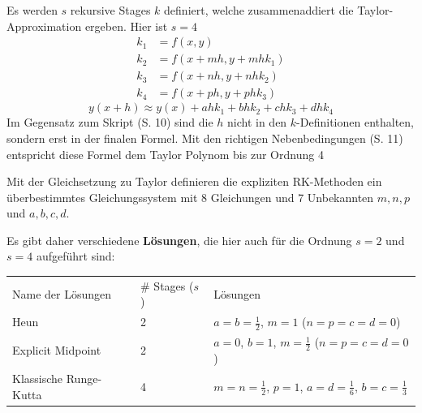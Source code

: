  \newpage     
      Es werden $s$ rekursive Stages $k$ definiert, welche zusammenaddiert die Taylor-Approximation ergeben.
      Hier ist $s=4$
      \begin{align*}
        k_1 &= f(x,y)\\
        k_2 &= f(x + m h, y+m h k_1)\\
        k_3 &= f(x + n h, y+n h  k_2)\\
        k_4 &= f(x + p h, y+p h k_3) 
      \end{align*}     
      $$y(x+h) \approx y(x) + a h k_1 + b h k_2 + c h k_3 + d h k_4 $$ 
      Im Gegensatz zum Skript (S. 10) sind die 
      $h$ nicht in den $k$-Definitionen enthalten, sondern erst in der finalen Formel. Mit den richtigen Nebenbedingungen (S. 11) 
      entspricht diese Formel dem Taylor Polynom bis zur Ordnung 4
      
      Mit der Gleichsetzung zu Taylor definieren die expliziten RK-Methoden ein 
      überbestimmtes Gleichungssystem mit 8 Gleichungen und 7 Unbekannten $m,n,p$ und $a,b,c,d$.
      
      Es gibt daher verschiedene \textbf{Lösungen}, die hier auch für die Ordnung $s=2$ und $s=4$ aufgeführt sind:\\
      \begin{tabular}{lll}
        Name der Lösungen & \# Stages ($s$) & Lösungen\\
        Heun & 2 & $a=b=\frac12$, $m=1$ ($n=p=c=d=0$)\\
        Explicit Midpoint & 2 & $a=0$, $b=1$, $m=\frac12$ ($n=p=c=d=0$)\\
        Klassische Runge-Kutta & 4 & $m=n=\frac12$, $p=1$, $a=d=\frac16$, $b=c=\frac13$
      \end{tabular}
    
